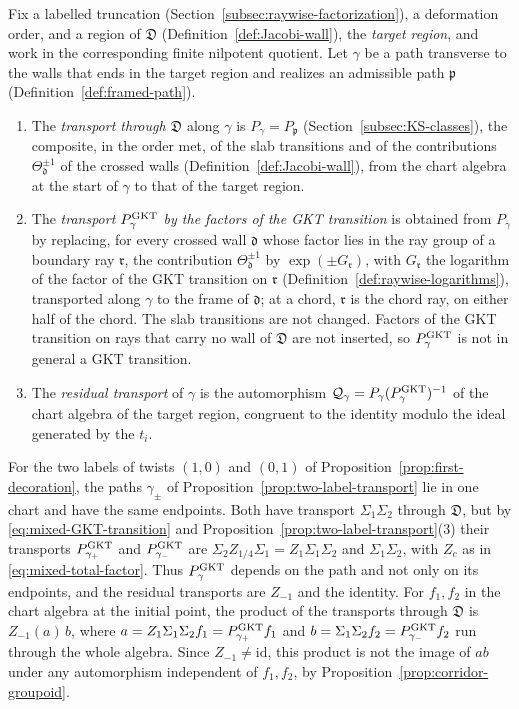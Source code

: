 \begin{definition}
\label{def:gkt-transport}
Fix a labelled truncation (Section~\ref{subsec:raywise-factorization}), a
deformation order, and a region of $\mathfrak D$
(Definition~\ref{def:Jacobi-wall}), the \emph{target region}, and work in the
corresponding finite nilpotent quotient.  Let $\gamma$ be a path transverse
to the walls that ends in the target region and realizes an admissible path
$\mathfrak p$ (Definition~\ref{def:framed-path}).
\begin{enumerate}
\item The \emph{transport through $\mathfrak D$} along $\gamma$ is
$P_\gamma=P_{\mathfrak p}$ (Section~\ref{subsec:KS-classes}), the composite,
in the order met, of the slab transitions and of the contributions
$\Theta_{\mathfrak d}^{\pm1}$ of the crossed walls
(Definition~\ref{def:Jacobi-wall}), from the chart algebra at the start of
$\gamma$ to that of the target region.
\item The \emph{transport $P^{\mathrm{GKT}}_\gamma$ by the factors of the GKT
transition} is obtained from $P_\gamma$
by replacing, for every crossed wall $\mathfrak d$ whose factor lies in the
ray group of a boundary ray $\mathfrak r$, the contribution
$\Theta_{\mathfrak d}^{\pm1}$ by $\exp(\pm G_{\mathfrak r})$, with
$G_{\mathfrak r}$ the logarithm of the factor of the GKT transition on
$\mathfrak r$ (Definition~\ref{def:raywise-logarithms}), transported along $\gamma$ to the
frame of $\mathfrak d$; at a chord, $\mathfrak r$ is the chord ray, on
either half of the chord.  The slab transitions are not changed.  Factors
of the GKT transition on rays that carry no wall of $\mathfrak D$ are not
inserted, so
$P^{\mathrm{GKT}}_\gamma$ is not in general a GKT transition.
\item The \emph{residual transport} of $\gamma$ is the automorphism
$\mathcal Q_\gamma=P_\gamma(P^{\mathrm{GKT}}_\gamma)^{-1}$ of the chart algebra of
the target region, congruent to the identity modulo the ideal generated by
the $t_i$.
\end{enumerate}
\end{definition}

For the two labels of twists $(1,0)$ and $(0,1)$ of
Proposition~\ref{prop:first-decoration}, the paths $\gamma_\pm$ of
Proposition~\ref{prop:two-label-transport} lie in one chart and have the same
endpoints.  Both have transport $\Sigma_1\Sigma_2$ through $\mathfrak D$, but
by \eqref{eq:mixed-GKT-transition} and
Proposition~\ref{prop:two-label-transport}(3) their transports
$P^{\mathrm{GKT}}_{\gamma_+}$ and $P^{\mathrm{GKT}}_{\gamma_-}$ are
$\Sigma_2Z_{1/4}\Sigma_1=Z_1\Sigma_1\Sigma_2$ and $\Sigma_1\Sigma_2$, with
$Z_c$ as in \eqref{eq:mixed-total-factor}.  Thus $P^{\mathrm{GKT}}_\gamma$ depends
on the path and not only on its endpoints, and the residual transports are
$Z_{-1}$ and the identity.  For $f_1,f_2$ in the chart algebra at the initial
point, the product of the transports through $\mathfrak D$ is $Z_{-1}(a)\,b$,
where $a=Z_1\Sigma_1\Sigma_2f_1=P^{\mathrm{GKT}}_{\gamma_+}f_1$ and
$b=\Sigma_1\Sigma_2f_2=P^{\mathrm{GKT}}_{\gamma_-}f_2$ run through the whole
algebra.  Since $Z_{-1}\neq\mathrm{id}$,
this product is not the image of $ab$ under any automorphism independent of
$f_1,f_2$, by Proposition~\ref{prop:corridor-groupoid}.

